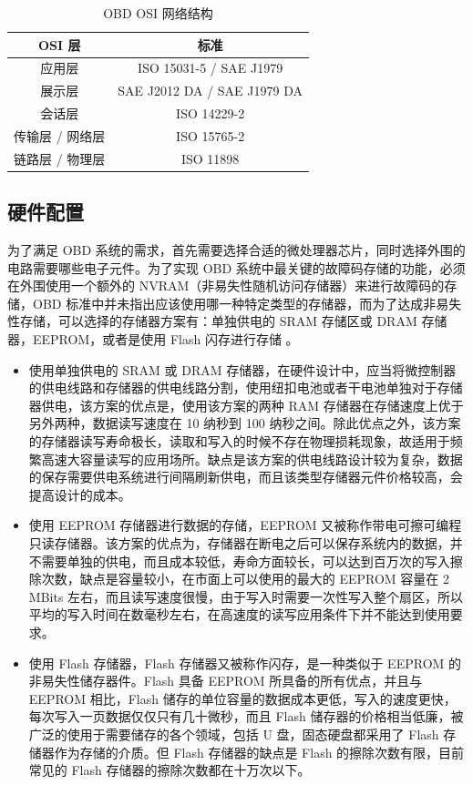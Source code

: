 \begin{table}
	\centering
	\caption{OBD OSI 网络结构} \label{tab:OBD_OSI}
	\begin{tabular*}{0.8\textwidth}{@{\extracolsep{\fill}}cc}
		\toprule
		OSI 层			&标准		 \\
		\midrule
		应用层           & ISO 15031-5 / SAE J1979    \\
		展示层           & SAE J2012 DA / SAE J1979 DA \\
        会话层           & ISO 14229-2 \\
        传输层 / 网络层           & ISO 15765-2 \\
        链路层 / 物理层           & ISO 11898      \\
		\bottomrule
	\end{tabular*}
\end{table}

\subsection{硬件配置}
为了满足 OBD 系统的需求，首先需要选择合适的微处理器芯片，同时选择外围的电路需要哪些电子元件。为了实现 OBD 系统中最关键的故障码存储的功能，必须在外围使用一个额外的 NVRAM（非易失性随机访问存储器）来进行故障码的存储，OBD 标准中并未指出应该使用哪一种特定类型的存储器，而为了达成非易失性存储，可以选择的存储器方案有：单独供电的 SRAM 存储区或 DRAM 存储器，EEPROM，或者是使用 Flash 闪存进行存储 \cite{Matas1997Memory}。

\begin{itemize}
	\item 使用单独供电的 SRAM 或 DRAM 存储器，在硬件设计中，应当将微控制器的供电线路和存储器的供电线路分割，使用纽扣电池或者干电池单独对于存储器供电，该方案的优点是，使用该方案的两种 RAM 存储器在存储速度上优于另外两种，数据读写速度在 10 纳秒到 100 纳秒之间。除此优点之外，该方案的存储器读写寿命极长，读取和写入的时候不存在物理损耗现象，故适用于频繁高速大容量读写的应用场所。缺点是该方案的供电线路设计较为复杂，数据的保存需要供电系统进行间隔刷新供电，而且该类型存储器元件价格较高，会提高设计的成本。
	\item 使用 EEPROM 存储器进行数据的存储，EEPROM 又被称作带电可擦可编程只读存储器。该方案的优点为，存储器在断电之后可以保存系统内的数据，并不需要单独的供电，而且成本较低，寿命方面较长，可以达到百万次的写入擦除次数，缺点是容量较小，在市面上可以使用的最大的 EEPROM 容量在 2 MBits 左右，而且读写速度很慢，由于写入时需要一次性写入整个扇区，所以平均的写入时间在数毫秒左右，在高速度的读写应用条件下并不能达到使用要求。
	\item 使用 Flash 存储器，Flash 存储器又被称作闪存，是一种类似于 EEPROM 的非易失性储存器件。Flash 具备 EEPROM 所具备的所有优点，并且与 EEPROM 相比，Flash 储存的单位容量的数据成本更低，写入的速度更快，每次写入一页数据仅仅只有几十微秒，而且 Flash 储存器的价格相当低廉，被广泛的使用于需要储存的各个领域，包括 U 盘，固态硬盘都采用了 Flash 存储器作为存储的介质。但 Flash 存储器的缺点是 Flash 的擦除次数有限，目前常见的 Flash 存储器的擦除次数都在十万次以下。
\end{itemize}

